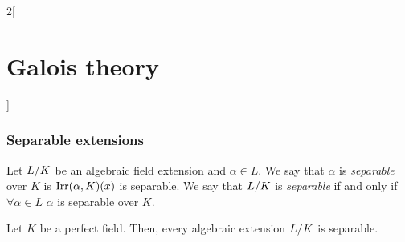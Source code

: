 \documentclass[../../../main.tex]{subfiles}
\begin{document}
\begin{multicols}{2}[\section{Galois theory}]
  \subsubsection{Separable extensions}
  \begin{definition}
    Let $\quot{L}{K}$ be an algebraic field extension and $\alpha\in L$. We say that $\alpha$ is \textit{separable} over $K$ is $\operatorname{Irr}(\alpha,K)(x)$ is separable. We say that $\quot{L}{K}$ is \textit{separable} if and only if $\forall \alpha\in L$ $\alpha$ is separable over $K$.
  \end{definition}
  \begin{corollary}
    Let $K$ be a perfect field. Then, every algebraic extension $\quot{L}{K}$ is separable.
  \end{corollary}
\end{multicols}
\end{document}
